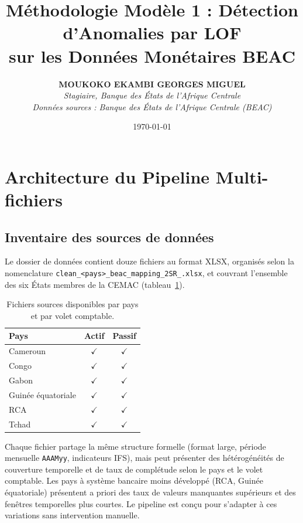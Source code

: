 \documentclass[12pt, a4paper]{article}
\title{
    \textbf{Méthodologie Modèle 1 : Détection d'Anomalies par LOF\\
    sur les Données Monétaires BEAC}\\[0.3em]
}
\author{
    \textbf{MOUKOKO EKAMBI GEORGES MIGUEL}\\[0.3em]
    \textit{Stagiaire, Banque des États de l'Afrique Centrale}\\
    \textit{Données sources : Banque des États de l'Afrique Centrale (BEAC)}
}
\date{\today}
\begin{document}
\maketitle
\tableofcontents
\newpage

\section{Architecture du Pipeline Multi-fichiers}
\label{sec:architecture}

\subsection{Inventaire des sources de données}
\label{subsec:inventaire}

Le dossier de données contient douze fichiers au format XLSX, organisés selon
la nomenclature
\texttt{clean\_<pays>\_beac\_mapping\_2SR\_<Actif|Passif>.xlsx},
et couvrant l'ensemble des six États membres de la CEMAC
(tableau~\ref{tab:fichiers}).

\begin{table}[htbp]
    \centering
    \caption{Fichiers sources disponibles par pays et par volet comptable.}
    \label{tab:fichiers}
    \begin{tabular}{lcc}
        \toprule
        \textbf{Pays} & \textbf{Actif} & \textbf{Passif} \\
        \midrule
        Cameroun            & $\checkmark$ & $\checkmark$ \\
        Congo               & $\checkmark$ & $\checkmark$ \\
        Gabon               & $\checkmark$ & $\checkmark$ \\
        Guinée équatoriale  & $\checkmark$ & $\checkmark$ \\
        RCA                 & $\checkmark$ & $\checkmark$ \\
        Tchad               & $\checkmark$ & $\checkmark$ \\
        \bottomrule
    \end{tabular}
\end{table}

Chaque fichier partage la même structure formelle (format large, période
mensuelle \texttt{AAAMyy}, indicateurs IFS), mais peut présenter des
hétérogénéités de couverture temporelle et de taux de complétude selon
le pays et le volet comptable. Les pays à système bancaire moins développé
(RCA, Guinée équatoriale) présentent a priori des taux de valeurs manquantes
supérieurs et des fenêtres temporelles plus courtes. Le pipeline est conçu
pour s'adapter à ces variations sans intervention manuelle.
\end{document}
